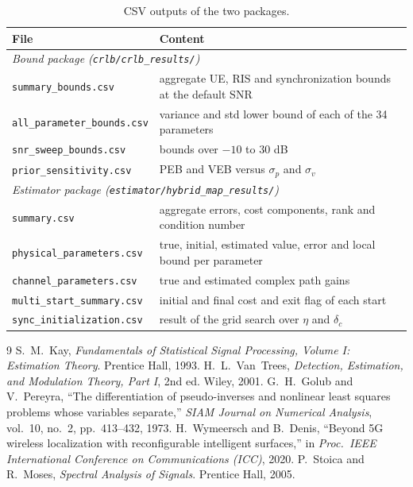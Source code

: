\documentclass[11pt,a4paper]{article}
\begin{document}
\begin{table}[H]
\centering
\caption{CSV outputs of the two packages.}
\small
\begin{tabular}{ll}
\toprule
File & Content\\
\midrule
\multicolumn{2}{l}{\textit{Bound package (\texttt{crlb/crlb\_results/})}}\\
\texttt{summary\_bounds.csv} & aggregate UE, RIS and synchronization bounds at the default SNR\\
\texttt{all\_parameter\_bounds.csv} & variance and std lower bound of each of the 34 parameters\\
\texttt{snr\_sweep\_bounds.csv} & bounds over $-10$ to $30$ dB\\
\texttt{prior\_sensitivity.csv} & PEB and VEB versus $\sigma_p$ and $\sigma_v$\\
\midrule
\multicolumn{2}{l}{\textit{Estimator package (\texttt{estimator/hybrid\_map\_results/})}}\\
\texttt{summary.csv} & aggregate errors, cost components, rank and condition number\\
\texttt{physical\_parameters.csv} & true, initial, estimated value, error and local bound per parameter\\
\texttt{channel\_parameters.csv} & true and estimated complex path gains\\
\texttt{multi\_start\_summary.csv} & initial and final cost and exit flag of each start\\
\texttt{sync\_initialization.csv} & result of the grid search over $\eta$ and $\delta_c$\\
\bottomrule
\end{tabular}
\end{table}

\begin{thebibliography}{9}
 S.~M.~Kay, \emph{Fundamentals of Statistical Signal Processing, Volume I: Estimation Theory}.
Prentice Hall, 1993.
 H.~L.~Van~Trees, \emph{Detection, Estimation, and Modulation Theory, Part I}, 2nd ed.
Wiley, 2001.
 G.~H.~Golub and V.~Pereyra, ``The differentiation of pseudo-inverses and nonlinear least
squares problems whose variables separate,'' \emph{SIAM Journal on Numerical Analysis}, vol.~10, no.~2,
pp.~413--432, 1973.
 H.~Wymeersch and B.~Denis, ``Beyond 5G wireless localization with reconfigurable
intelligent surfaces,'' in \emph{Proc.\ IEEE International Conference on Communications (ICC)}, 2020.
 P.~Stoica and R.~Moses, \emph{Spectral Analysis of Signals}. Prentice Hall, 2005.
\end{thebibliography}
\end{document}
